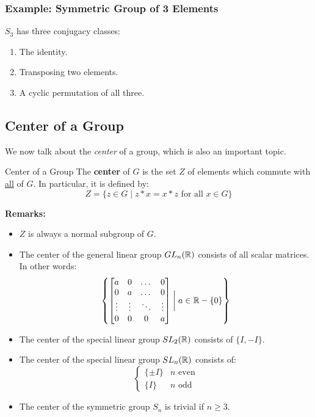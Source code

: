 \documentclass[letterpaper]{article}
\begin{document}
\subsubsection{Example: Symmetric Group of 3 Elements}
$S_3$ has three conjugacy classes: 
\begin{enumerate}
    \item The identity. 
    \item Transposing two elements. 
    \item A cyclic permutation of all three. 
\end{enumerate}

\subsection{Center of a Group}
We now talk about the \emph{center} of a group, which is also an important topic. 

\begin{definition}{Center of a Group}{}
    The \textbf{center} of $G$ is the set $Z$ of elements which commute with \underline{all} of $G$. In particular, it is defined by: 
    \[Z = \{z \in G \mid z * x = x * z \text{ for all } x \in G\}\]
\end{definition}
\textbf{Remarks:}
\begin{itemize}
    \item $Z$ is always a normal subgroup of $G$. 
    \item The center of the general linear group $GL_{n}(\mathbb{R})$ consists of all scalar matrices. In other words:
    \[\left\{\begin{bmatrix}
        a & 0 & \dots & 0 \\ 
        0 & a & \dots & 0 \\ 
        \vdots & \vdots & \ddots & \vdots \\ 
        0 & 0 & 0 & a 
    \end{bmatrix} \mathrel{\bigg|} a \in \mathbb{R} - \{0\}\right\}\]
    \item The center of the special linear group $SL_{2}(\mathbb{R})$ consists of $\{I, -I\}$. 
    \item The center of the special linear group $SL_{n}(\mathbb{R})$ consists of: 
    \[
        \begin{cases}
            \{\pm I\} & n \text{ even} \\ 
            \{I\} & n \text{ odd}
        \end{cases}    
    \]
    \item The center of the symmetric group $S_n$ is trivial if $n \geq 3$.
\end{itemize}
\end{document}
